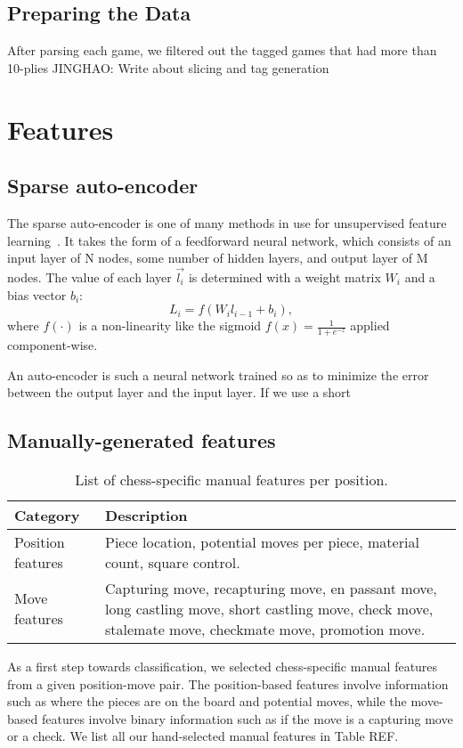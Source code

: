 \documentclass[11pt]{article}
\begin{document}
\subsection{Preparing the Data}
After parsing each game, we filtered out the tagged games that had more than 10-plies
JINGHAO: Write about slicing and tag generation

\section{Features}
\subsection{Sparse auto-encoder}
The sparse auto-encoder is one of many methods in use for unsupervised feature learning~\cite{single-layer-networks-unsupervised-feature-learning}. It takes the form of a feedforward neural network, which consists of an input layer of N nodes, some number of hidden layers, and output layer of M nodes. The value of each layer $\vec{l_i}$ is determined with a weight matrix $W_i$ and a bias vector $b_i$: \[L_i = f(W_i l_{i-1} + b_i),\] where $f(\cdot)$ is a non-linearity like the sigmoid $f(x) = \frac{1}{1 + e^{-z}}$ applied component-wise.

An auto-encoder is such a neural network trained so as to minimize the error between the output layer and the input layer. If we use a short


\subsection{Manually-generated features}
\begin{table*}
\begin{tabular}{lp{}}
\hline
\textbf{Category} & \textbf{Description} \\ \hline
Position features & Piece location, potential moves per piece, material count, square control. \\
Move features & Capturing move, recapturing move, en passant move, long castling move, short castling move, check move, stalemate move, checkmate move, promotion move.
\hline
\end{tabular} 
\caption{List of chess-specific manual features per position.}
\end{table*}

As a first step towards classification, we selected chess-specific manual features from a given position-move pair.  The position-based features involve information such as where the pieces are on the board and potential moves, while the move-based features involve binary information such as if the move is a capturing move or a check.  We list all our hand-selected manual features in Table REF.
\end{document}
